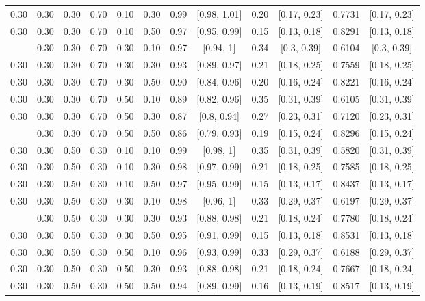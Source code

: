 \documentclass[
  11pt,
]{article}
\begin{document}
\begin{landscape}
\begin{ThreePartTable}
\begin{longtable}[t]{cccccccccccc}
0.30 & 0.30 & 0.30 & 0.70 & 0.10 & 0.30 & 0.99 & {}[0.98, 1.01] & 0.20 & {}[0.17, 0.23] & 0.7731 & {}[0.17, 0.23]\\
0.30 & 0.30 & 0.30 & 0.70 & 0.10 & 0.50 & 0.97 & {}[0.95, 0.99] & 0.15 & {}[0.13, 0.18] & 0.8291 & {}[0.13, 0.18]\\
\addlinespace
0.30 & 0.30 & 0.30 & 0.70 & 0.30 & 0.10 & 0.97 & {}[0.94, 1] & 0.34 & {}[0.3, 0.39] & 0.6104 & {}[0.3, 0.39]\\
0.30 & 0.30 & 0.30 & 0.70 & 0.30 & 0.30 & 0.93 & {}[0.89, 0.97] & 0.21 & {}[0.18, 0.25] & 0.7559 & {}[0.18, 0.25]\\
0.30 & 0.30 & 0.30 & 0.70 & 0.30 & 0.50 & 0.90 & {}[0.84, 0.96] & 0.20 & {}[0.16, 0.24] & 0.8221 & {}[0.16, 0.24]\\
0.30 & 0.30 & 0.30 & 0.70 & 0.50 & 0.10 & 0.89 & {}[0.82, 0.96] & 0.35 & {}[0.31, 0.39] & 0.6105 & {}[0.31, 0.39]\\
0.30 & 0.30 & 0.30 & 0.70 & 0.50 & 0.30 & 0.87 & {}[0.8, 0.94] & 0.27 & {}[0.23, 0.31] & 0.7120 & {}[0.23, 0.31]\\
\addlinespace
0.30 & 0.30 & 0.30 & 0.70 & 0.50 & 0.50 & 0.86 & {}[0.79, 0.93] & 0.19 & {}[0.15, 0.24] & 0.8296 & {}[0.15, 0.24]\\
0.30 & 0.30 & 0.50 & 0.30 & 0.10 & 0.10 & 0.99 & {}[0.98, 1] & 0.35 & {}[0.31, 0.39] & 0.5820 & {}[0.31, 0.39]\\
0.30 & 0.30 & 0.50 & 0.30 & 0.10 & 0.30 & 0.98 & {}[0.97, 0.99] & 0.21 & {}[0.18, 0.25] & 0.7585 & {}[0.18, 0.25]\\
0.30 & 0.30 & 0.50 & 0.30 & 0.10 & 0.50 & 0.97 & {}[0.95, 0.99] & 0.15 & {}[0.13, 0.17] & 0.8437 & {}[0.13, 0.17]\\
0.30 & 0.30 & 0.50 & 0.30 & 0.30 & 0.10 & 0.98 & {}[0.96, 1] & 0.33 & {}[0.29, 0.37] & 0.6197 & {}[0.29, 0.37]\\
\addlinespace
0.30 & 0.30 & 0.50 & 0.30 & 0.30 & 0.30 & 0.93 & {}[0.88, 0.98] & 0.21 & {}[0.18, 0.24] & 0.7780 & {}[0.18, 0.24]\\
0.30 & 0.30 & 0.50 & 0.30 & 0.30 & 0.50 & 0.95 & {}[0.91, 0.99] & 0.15 & {}[0.13, 0.18] & 0.8531 & {}[0.13, 0.18]\\
0.30 & 0.30 & 0.50 & 0.30 & 0.50 & 0.10 & 0.96 & {}[0.93, 0.99] & 0.33 & {}[0.29, 0.37] & 0.6188 & {}[0.29, 0.37]\\
0.30 & 0.30 & 0.50 & 0.30 & 0.50 & 0.30 & 0.93 & {}[0.88, 0.98] & 0.21 & {}[0.18, 0.24] & 0.7667 & {}[0.18, 0.24]\\
0.30 & 0.30 & 0.50 & 0.30 & 0.50 & 0.50 & 0.94 & {}[0.89, 0.99] & 0.16 & {}[0.13, 0.19] & 0.8517 & {}[0.13, 0.19]\\

\end{longtable}
\end{ThreePartTable}
\end{landscape}
\end{document}
